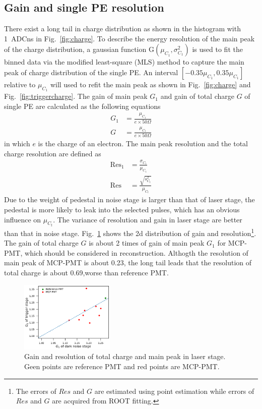\subsection{Gain and single PE resolution}
\label{sec:noisegain}
There exist a long tail in charge distribution as shown in the histogram with \SI{1}{ADCns} in Fig.~\ref{fig:charge}. To describe the energy resolution of the main peak of the charge distribution, a gaussian function G$(\mu_{C_1},\sigma^2_{C_1})$ is used to fit the binned data via the modified least-square (MLS) method \cite{Cowan1998StatisticalDA} to capture the main peak of charge distribution of the single PE. An interval $[-0.35\mu_{C_1}, 0.35\mu_{C_1}]$ relative to $\mu_{C_1}$ will used to refit the main peak as shown in Fig.~\ref{fig:charge} and Fig.~\ref{fig:triggercharge}. The gain of main peak $G_1$ and gain of total charge $G$ of single PE are calculated as the following equations
\begin{align}
    G_1&=\frac{\mu_{C_1}}{e\times 50\Omega} \\
    G &= \frac{\mu_{C_t}}{e\times 50\Omega}
\end{align}
in which $e$ is the charge of an electron. The main peak resolution and the total charge resolution are defined as
\begin{align}
    \mathrm{Res}_1&=\frac{\sigma_{C_1}}{\mu_{C_1}}\\
    \mathrm{Res}&=\frac{\sqrt{s^2_{C_t}}}{\mu_{C_t}}
\end{align}
Due to the weight of pedestal in noise stage is larger than that of laser stage, the pedestal is more likely to leak into the selected pulses, which has an obvious influence on $\mu_{C_t}$. The variance of resolution and gain in laser stage are better than that in noise stage. Fig.~\ref{fig:totalchargeCompare} shows the 2d distribution of gain and resolution\footnote{The errors of $Res$ and $G$ are estimated using point estimation while errors of $Res$ and $G$ are acquired from ROOT fitting.}. The gain of total charge $G$ is about 2 times of gain of main peak $G_1$ for MCP-PMT, which should be considered in reconstruction. Althogth the resolution of main peak of MCP-PMT is about 0.23, the long tail leads that the resolution of total charge is about 0.69,worse than reference PMT.

\begin{figure}[!htbp]
    \centering
    \includegraphics[width=0.4\textwidth,page=4]{figures/result/compare.pdf}
    \caption{Gain and resolution of total charge and main peak in laser stage. Geen points are reference PMT and red points are MCP-PMT.}
    \label{fig:totalchargeCompare}
\end{figure}
